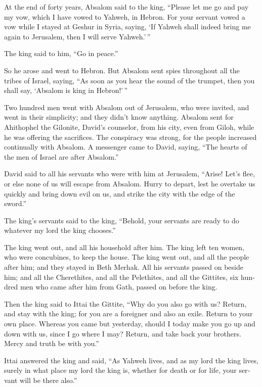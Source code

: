 \begin{paracol}{2}
\begin{otherlanguage}{english}
 At the end of forty years, Absalom said to the king,
``Please let me go and pay my vow, which I have vowed to Yahweh, in
Hebron.  For your servant vowed a vow while I stayed at
Geshur in Syria, saying, `If Yahweh shall indeed bring me again to
Jerusalem, then I will serve Yahweh.'\,''

 The king said to him, ``Go in peace.''

So he arose and went to Hebron.  But Absalom sent spies
throughout all the tribes of Israel, saying, ``As soon as you hear the
sound of the trumpet, then you shall say, `Absalom is king in
Hebron!'\,''

 Two hundred men went with Absalom out of Jerusalem, who
were invited, and went in their simplicity; and they didn't know
anything.  Absalom sent for Ahithophel the Gilonite,
David's counselor, from his city, even from Giloh, while he was offering
the sacrifices. The conspiracy was strong, for the people increased
continually with Absalom.  A messenger came to David,
saying, ``The hearts of the men of Israel are after Absalom.''

 David said to all his servants who were with him at
Jerusalem, ``Arise! Let's flee, or else none of us will escape from
Absalom. Hurry to depart, lest he overtake us quickly and bring down
evil on us, and strike the city with the edge of the sword.''

 The king's servants said to the king, ``Behold, your
servants are ready to do whatever my lord the king chooses.''

 The king went out, and all his household after him. The
king left ten women, who were concubines, to keep the house.
 The king went out, and all the people after him; and
they stayed in Beth Merhak.  All his servants passed on
beside him; and all the Cherethites, and all the Pelethites, and all the
Gittites, six hundred men who came after him from Gath, passed on before
the king.

 Then the king said to Ittai the Gittite, ``Why do you
also go with us? Return, and stay with the king; for you are a foreigner
and also an exile. Return to your own place.  Whereas you
came but yesterday, should I today make you go up and down with us,
since I go where I may? Return, and take back your brothers. Mercy and
truth be with you.''

 Ittai answered the king and said, ``As Yahweh lives, and
as my lord the king lives, surely in what place my lord the king is,
whether for death or for life, your servant will be there also.''


\end{otherlanguage}
\end{paracol}
